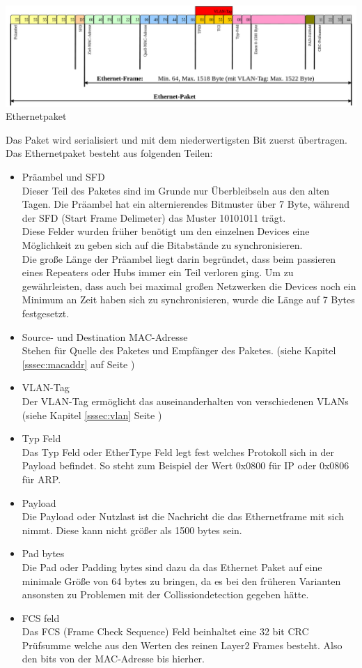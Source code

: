 \documentclass[11pt,a4paper]{report}
\begin{document}
\begin{center}
\includegraphics[scale=0.35]{../docs/tarkes/pics/Ethernetpaket.png}
Ethernetpaket
\end{center}

Das Paket wird serialisiert und mit dem niederwertigsten Bit zuerst übertragen. Das Ethernetpaket besteht aus folgenden Teilen:
\begin{itemize}
\item Präambel und SFD\\
Dieser Teil des Paketes sind im Grunde nur Überbleibseln aus den alten Tagen. Die Präambel hat ein alternierendes Bitmuster über 7 Byte, während der SFD (Start Frame Delimeter) das Muster 10101011 trägt.\\
Diese Felder wurden früher benötigt um den einzelnen Devices eine Möglichkeit zu geben sich auf die Bitabstände zu synchronisieren.\\
Die große Länge der Präambel liegt darin begründet, dass beim passieren eines Repeaters oder Hubs immer ein Teil verloren ging. Um zu gewährleisten, dass auch bei maximal großen Netzwerken die Devices noch ein Minimum an Zeit haben sich zu synchronisieren, wurde die Länge auf 7 Bytes festgesetzt. 
\item Source- und Destination MAC-Adresse\\
Stehen für Quelle des Paketes und Empfänger des Paketes. (siehe Kapitel \ref{sssec:macaddr} auf Seite \pageref{sssec:macaddr})
\item VLAN-Tag\\
Der VLAN-Tag ermöglicht das auseinanderhalten von verschiedenen VLANs (siehe Kapitel \ref{sssec:vlan} Seite \pageref{sssec:vlan})
\item Typ Feld\\
Das Typ Feld oder EtherType Feld legt fest welches Protokoll sich in der Payload befindet. So steht zum Beispiel der Wert 0x0800 für IP oder 0x0806 für ARP.
\item Payload\\
Die Payload oder Nutzlast ist die Nachricht die das Ethernetframe mit sich nimmt. Diese kann nicht größer als 1500 bytes sein.
\item Pad bytes\\
Die Pad oder Padding bytes sind dazu da das Ethernet Paket auf eine minimale Größe von 64 bytes zu bringen, da es bei den früheren Varianten ansonsten zu Problemen mit der Collissiondetection gegeben hätte.
\item FCS feld\\
Das FCS (Frame Check Sequence) Feld beinhaltet eine 32 bit CRC Prüfsumme welche aus den Werten des reinen Layer2 Frames besteht. Also den bits von der MAC-Adresse bis hierher.
\end{itemize}
\end{document}

